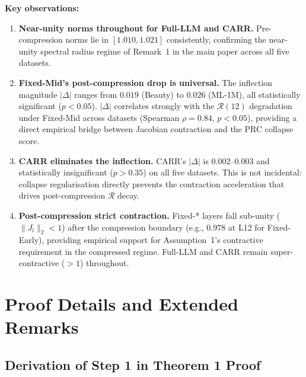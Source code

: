 \documentclass[letterpaper,10pt]{article}
\begin{document}
\noindent\textbf{Key observations:}
\begin{enumerate}
  \item \textbf{Near-unity norms throughout for Full-LLM and CARR.} Pre-compression norms lie in $[1.010, 1.021]$ consistently, confirming the near-unity spectral radius regime of Remark~1 in the main paper across all five datasets.
  \item \textbf{Fixed-Mid's post-compression drop is universal.} The inflection magnitude $|\Delta|$ ranges from $0.019$ (Beauty) to $0.026$ (ML-1M), all statistically significant ($p<0.05$). $|\Delta|$ correlates strongly with the $\mathcal{R}(12)$ degradation under Fixed-Mid across datasets (Spearman $\rho = 0.84$, $p < 0.05$), providing a direct empirical bridge between Jacobian contraction and the PRC collapse score.
  \item \textbf{CARR eliminates the inflection.} CARR's $|\Delta|$ is $0.002$--$0.003$ and statistically insignificant ($p > 0.35$) on all five datasets. This is not incidental: collapse regularisation directly prevents the contraction acceleration that drives post-compression $\mathcal{R}$ decay.
  \item \textbf{Post-compression strict contraction.} Fixed-* layers fall sub-unity ($\|J_l\|_2 < 1$) after the compression boundary (e.g., $0.978$ at L12 for Fixed-Early), providing empirical support for Assumption~1's contractive requirement in the compressed regime. Full-LLM and CARR remain super-contractive ($>1$) throughout.
\end{enumerate}

\section{Proof Details and Extended Remarks}
\label{sec:supp-proofs}

\subsection{Derivation of Step 1 in Theorem 1 Proof}
\end{document}
